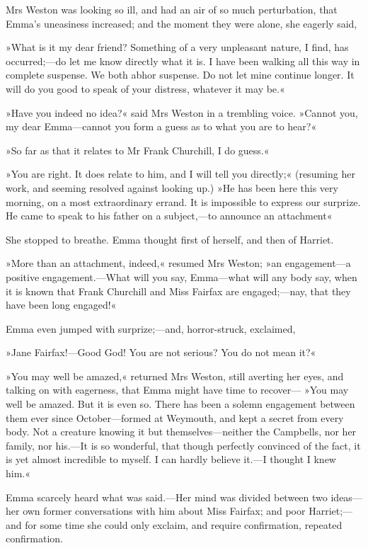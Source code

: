 Mrs Weston was looking so ill, and had an air of so much perturbation, that Emma's uneasiness increased; and the moment they were alone, she eagerly said,

»What is it my dear friend? Something of a very unpleasant nature, I find, has occurred;—do let me know directly what it is. I have been walking all this way in complete suspense. We both abhor suspense. Do not let mine continue longer. It will do you good to speak of your distress, whatever it may be.«

»Have you indeed no idea?« said Mrs Weston in a trembling voice. »Cannot you, my dear Emma—cannot you form a guess as to what you are to hear?«

»So far as that it relates to Mr Frank Churchill, I do guess.«

»You are right. It does relate to him, and I will tell you directly;« (resuming her work, and seeming resolved against looking up.) »He has been here this very morning, on a most extraordinary errand. It is impossible to express our surprize. He came to speak to his father on a subject,—to announce an attachment\longdash«

She stopped to breathe. Emma thought first of herself, and then of Harriet.

»More than an attachment, indeed,« resumed Mrs Weston; »an engagement—a positive engagement.—What will you say, Emma—what will any body say, when it is known that Frank Churchill and Miss Fairfax are engaged;—nay, that they have been long engaged!«

Emma even jumped with surprize;—and, horror-struck, exclaimed,

»Jane Fairfax!—Good God! You are not serious? You do not mean it?«

»You may well be amazed,« returned Mrs Weston, still averting her eyes, and talking on with eagerness, that Emma might have time to recover— »You may well be amazed. But it is even so. There has been a solemn engagement between them ever since October—formed at Weymouth, and kept a secret from every body. Not a creature knowing it but themselves—neither the Campbells, nor her family, nor his.—It is so wonderful, that though perfectly convinced of the fact, it is yet almost incredible to myself. I can hardly believe it.—I thought I knew him.«

Emma scarcely heard what was said.—Her mind was divided between two ideas—her own former conversations with him about Miss Fairfax; and poor Harriet;—and for some time she could only exclaim, and require confirmation, repeated confirmation.

